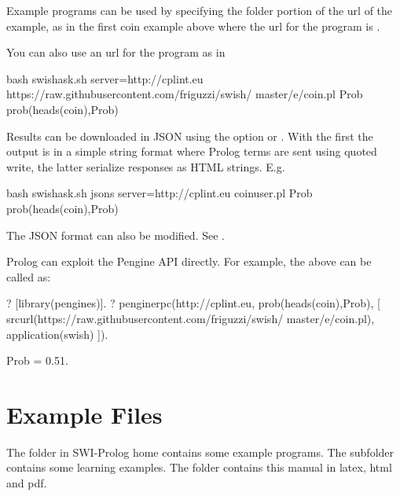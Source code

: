 \documentclass[letterpaper,10pt,english]{sphinxmanual}
\begin{document}
Example programs can be used by specifying the folder portion of the url of the example, as in the first coin example above where the url for the program is .

You can also use an url for the program as in

\begin{sphinxVerbatim}[commandchars=\\\{\}]
\PYGZdl{} bash swish\PYGZhy{}ask.sh \PYGZhy{}\PYGZhy{}server=http://cplint.eu \PYGZbs{}
https://raw.githubusercontent.com/friguzzi/swish/\PYGZbs{}
master/e/coin.pl Prob \PYGZdq{}prob(heads(coin),Prob)\PYGZdq{}
\end{sphinxVerbatim}

Results can be downloaded in JSON using the option  or . With the first the output is in a simple string format where Prolog terms are sent using quoted write, the latter serialize responses as HTML strings.
E.g.

\begin{sphinxVerbatim}[commandchars=\\\{\}]
\PYGZdl{} bash swish\PYGZhy{}ask.sh \PYGZhy{}\PYGZhy{}json\PYGZhy{}s \PYGZhy{}\PYGZhy{}server=http://cplint.eu \PYGZbs{}
        coin\PYGZus{}user.pl Prob \PYGZdq{}prob(heads(coin),Prob)\PYGZdq{}
\end{sphinxVerbatim}

The JSON format can also be modified.
See .

Prolog can exploit the Pengine API directly. For example, the above can be called as:

\begin{sphinxVerbatim}[commandchars=\\\{\}]
?\PYGZhy{} [library(pengines)].
?\PYGZhy{} pengine\PYGZus{}rpc(\PYGZsq{}http://cplint.eu\PYGZsq{},
        prob(heads(coin),Prob),
        [ src\PYGZus{}url(\PYGZsq{}https://raw.githubusercontent.com/friguzzi/swish/\PYGZbs{}
                master/e/coin.pl\PYGZsq{}),
                application(swish)
]).

Prob = 0.51.
\end{sphinxVerbatim}


\chapter{Example Files}
\label{\detokenize{index:example-files}}
The  folder in SWI-Prolog home contains some example programs.
The subfolder  contains some learning examples.
The  folder contains this manual in latex, html and pdf.
\end{document}
